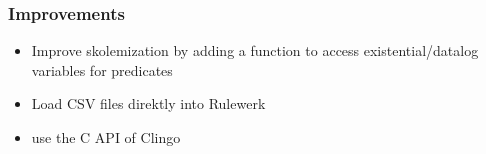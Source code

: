 \documentclass{beamer}
\begin{document}
\begin{frame}
\frametitle{Improvements}
\begin{itemize}
\item Improve skolemization by adding a function to access existential/datalog variables for predicates
\item Load CSV files direktly into Rulewerk
\item use the C API of Clingo
\end{itemize}
\end{frame}

\end{document}

